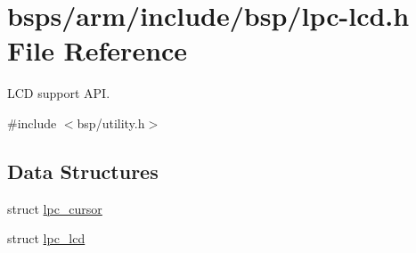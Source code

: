 \hypertarget{lpc-lcd_8h}{}\section{bsps/arm/include/bsp/lpc-\/lcd.h File Reference}
\label{lpc-lcd_8h}


L\+CD support A\+PI.  


{\ttfamily \#include $<$bsp/utility.\+h$>$}\newline
\subsection*{Data Structures}
\begin{DoxyCompactItemize}
\item 
struct \mbox{\hyperlink{structlpc__cursor}{lpc\+\_\+cursor}}
\item 
struct \mbox{\hyperlink{structlpc__lcd}{lpc\+\_\+lcd}}
\end{DoxyCompactItemize}
